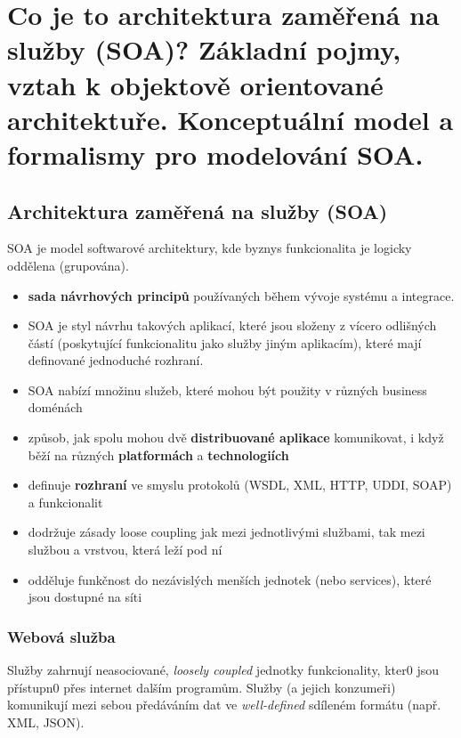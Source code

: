 \section[AOS - SOA]{Co je to architektura zaměřená na služby (SOA)? Základní pojmy, vztah k objektově orientované architektuře. Konceptuální model a formalismy pro modelování SOA.}

\subsection{Architektura zaměřená na služby (SOA)}
SOA je model softwarové architektury, kde byznys funkcionalita je logicky oddělena (grupována).

\begin{itemize}[itemsep=0px]
\item \textbf{sada návrhových principů} používaných během vývoje systému a integrace.
\item SOA je styl návrhu takových aplikací, které jsou složeny z vícero odlišných částí (poskytující funkcionalitu jako služby jiným aplikacím), které mají definované jednoduché rozhraní.
\item SOA nabízí množinu služeb, které mohou být použity v různých business doménách
\item způsob, jak spolu mohou dvě \textbf{distribuované aplikace} komunikovat, i když běží na různých \textbf{platformách} a \textbf{technologiích}
\item definuje \textbf{rozhraní} ve smyslu protokolů (WSDL, XML, HTTP, UDDI, SOAP) a funkcionalit
\item dodržuje zásady loose coupling jak mezi jednotlivými službami, tak mezi službou a vrstvou, která leží pod ní
\item odděluje funkčnost do nezávislých menších jednotek (nebo services), které jsou dostupné na síti
\end{itemize}

\textit{}

\subsubsection{Webová služba}
Služby zahrnují neasociované, \textit{loosely coupled} jednotky funkcionality, kter0 jsou přístupn0 přes internet dalším programům. Služby (a jejich konzumeři) komunikují mezi sebou předáváním dat ve \textit{well-defined} sdíleném formátu (např. XML, JSON).

